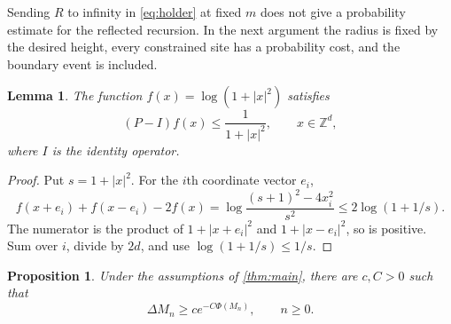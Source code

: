 \documentclass[11pt]{amsart}
\newtheorem{proposition}[theorem]{Proposition}
\newtheorem{lemma}[theorem]{Lemma}
\theoremstyle{remark}
\newcommand{\Z}{\mathbb Z}
\begin{document}
Sending $R$ to infinity in \eqref{eq:holder} at fixed $m$ does not give a
probability estimate for the reflected recursion. In the next argument
the radius is fixed by the desired height, every constrained site has a
probability cost, and the boundary event is included.

\begin{lemma}\label{lem:barrier}
The function $f(x)=\log(1+|x|^2)$ satisfies
\begin{equation}\label{eq:barrier}
 (P-I)f(x)\le\frac1{1+|x|^2},\qquad x\in\Z^d,
\end{equation}
where $I$ is the identity operator.
\end{lemma}

\begin{proof}
Put $s=1+|x|^2$. For the $i$th coordinate vector $e_i$,
\[
 f(x+e_i)+f(x-e_i)-2f(x)
 =\log\frac{(s+1)^2-4x_i^2}{s^2}
 \le2\log(1+1/s).
\]
The numerator is the product of $1+|x+e_i|^2$ and $1+|x-e_i|^2$,
so is positive. Sum over $i$, divide by $2d$, and use
$\log(1+1/s)\le1/s$.
\end{proof}

\begin{proposition}\label{prop:lowerincrement}
Under the assumptions of \cref{thm:main}, there are $c,C>0$ such that
\begin{equation}\label{eq:lowerincrement}
 \Delta M_n\ge c e^{-C\Phi(M_n)},\qquad n\ge0.
\end{equation}
\end{proposition}
\end{document}

